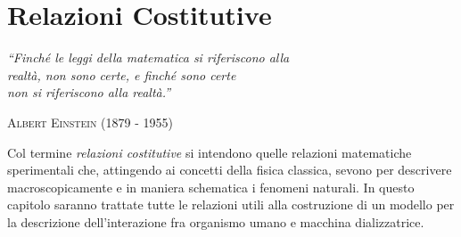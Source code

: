 \chapter{Relazioni Costitutive}\label{ch:rc}

\begin{flushright}
\textit{``Finché le leggi della matematica si riferiscono alla\\ realtà, non sono certe, e finché sono certe\\ non si riferiscono alla realtà.''}
\end{flushright}
\begin{flushright} \textsc{Albert Einstein} (1879 - 1955) \end{flushright} 
\begin{flushright} { } \end{flushright}

Col termine \textit{relazioni costitutive} si intendono quelle relazioni matematiche sperimentali che, attingendo ai concetti della fisica classica, sevono per descrivere macroscopicamente e in maniera schematica i fenomeni naturali. In questo capitolo saranno trattate tutte le relazioni utili alla costruzione di un modello per la descrizione dell'interazione fra organismo umano e macchina dializzatrice. 














%
